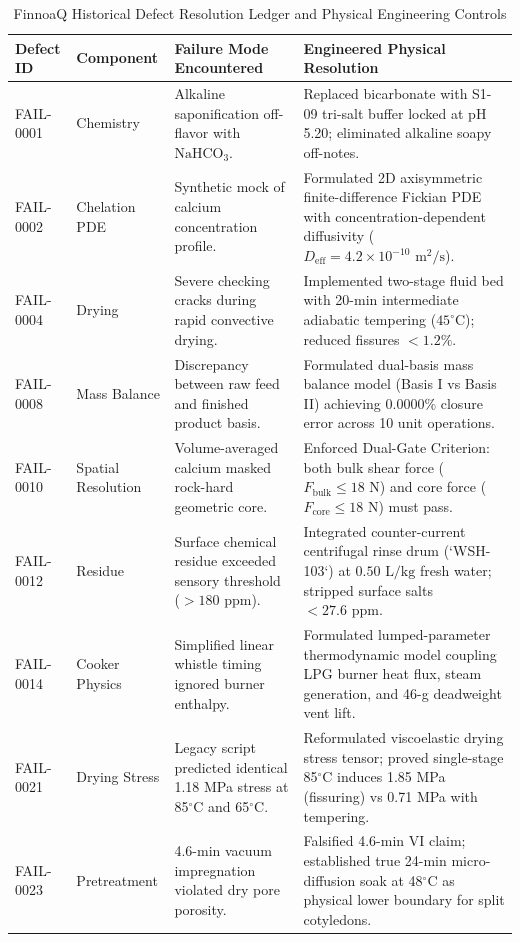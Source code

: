 \documentclass[10pt,a4paper]{article}
\begin{document}
\begin{table}[H]
\centering
\small
\caption{FinnoaQ Historical Defect Resolution Ledger and Physical Engineering Controls}
\label{tab:defect_ledger}
\begin{tabularx}{\linewidth}{lp{2.4cm}p{3.6cm}X}
\toprule
\textbf{Defect ID} & \textbf{Component} & \textbf{Failure Mode Encountered} & \textbf{Engineered Physical Resolution} \\
\midrule
FAIL-0001 & Chemistry & Alkaline saponification off-flavor with $\text{NaHCO}_3$. & Replaced bicarbonate with S1-09 tri-salt buffer locked at pH 5.20; eliminated alkaline soapy off-notes. \\
FAIL-0002 & Chelation PDE & Synthetic mock of calcium concentration profile. & Formulated 2D axisymmetric finite-difference Fickian PDE with concentration-dependent diffusivity ($D_{\text{eff}} = 4.2 \times 10^{-10}\text{ m}^2/\text{s}$). \\
FAIL-0004 & Drying & Severe checking cracks during rapid convective drying. & Implemented two-stage fluid bed with 20-min intermediate adiabatic tempering ($45^\circ\text{C}$); reduced fissures $< 1.2\%$. \\
FAIL-0008 & Mass Balance & Discrepancy between raw feed and finished product basis. & Formulated dual-basis mass balance model (Basis I vs Basis II) achieving $0.0000\%$ closure error across 10 unit operations. \\
FAIL-0010 & Spatial Resolution & Volume-averaged calcium masked rock-hard geometric core. & Enforced Dual-Gate Criterion: both bulk shear force ($F_{\text{bulk}} \le 18\text{ N}$) and core force ($F_{\text{core}} \le 18\text{ N}$) must pass. \\
FAIL-0012 & Residue & Surface chemical residue exceeded sensory threshold ($> 180\text{ ppm}$). & Integrated counter-current centrifugal rinse drum (`WSH-103`) at $0.50\text{ L/kg}$ fresh water; stripped surface salts $< 27.6\text{ ppm}$. \\
FAIL-0014 & Cooker Physics & Simplified linear whistle timing ignored burner enthalpy. & Formulated lumped-parameter thermodynamic model coupling LPG burner heat flux, steam generation, and 46-g deadweight vent lift. \\
FAIL-0021 & Drying Stress & Legacy script predicted identical 1.18 MPa stress at 85$^\circ$C and 65$^\circ$C. & Reformulated viscoelastic drying stress tensor; proved single-stage 85$^\circ$C induces 1.85 MPa (fissuring) vs 0.71 MPa with tempering. \\
FAIL-0023 & Pretreatment & 4.6-min vacuum impregnation violated dry pore porosity. & Falsified 4.6-min VI claim; established true 24-min micro-diffusion soak at 48$^\circ$C as physical lower boundary for split cotyledons. \\

\end{tabularx}
\end{table}
\end{document}
